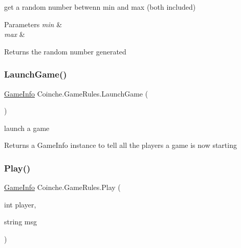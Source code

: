 get a random number betwenn min and max (both included) 


\begin{DoxyParams}{Parameters}
{\em min} & \\
\hline
{\em max} & \\
\hline
\end{DoxyParams}
\begin{DoxyReturn}{Returns}
the random number generated
\end{DoxyReturn}
\mbox{\label{class_coinche_1_1_game_rules_a7ecb23a0c1a81fa162940a43ccefe022}} 
\subsubsection{\texorpdfstring{Launch\+Game()}{LaunchGame()}}
{\footnotesize\ttfamily \hyperlink{class_coinche_1_1_tools_1_1_game_info}{Game\+Info} Coinche.\+Game\+Rules.\+Launch\+Game (\begin{DoxyParamCaption}{ }\end{DoxyParamCaption})\hspace{0.3cm}{\ttfamily [inline]}}



launch a game 

\begin{DoxyReturn}{Returns}
a Game\+Info instance to tell all the players a game is now starting
\end{DoxyReturn}
\mbox{\label{class_coinche_1_1_game_rules_aa053d6c7c191f62268d4bb5a37c32810}} 
\subsubsection{\texorpdfstring{Play()}{Play()}}
{\footnotesize\ttfamily \hyperlink{class_coinche_1_1_tools_1_1_game_info}{Game\+Info} Coinche.\+Game\+Rules.\+Play (\begin{DoxyParamCaption}\item[{int}]{player,  }\item[{string}]{msg }\end{DoxyParamCaption})\hspace{0.3cm}{\ttfamily [inline]}}



